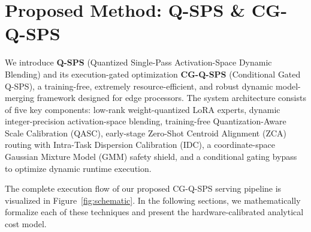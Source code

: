 \section{Proposed Method: Q-SPS \& CG-Q-SPS}
\label{sec:method}

We introduce \textbf{Q-SPS} (Quantized Single-Pass Activation-Space Dynamic Blending) and its execution-gated optimization \textbf{CG-Q-SPS} (Conditional Gated Q-SPS), a training-free, extremely resource-efficient, and robust dynamic model-merging framework designed for edge processors. The system architecture consists of five key components: low-rank weight-quantized LoRA experts, dynamic integer-precision activation-space blending, training-free Quantization-Aware Scale Calibration (QASC), early-stage Zero-Shot Centroid Alignment (ZCA) routing with Intra-Task Dispersion Calibration (IDC), a coordinate-space Gaussian Mixture Model (GMM) safety shield, and a conditional gating bypass to optimize dynamic runtime execution.

The complete execution flow of our proposed CG-Q-SPS serving pipeline is visualized in Figure~\ref{fig:schematic}. In the following sections, we mathematically formalize each of these techniques and present the hardware-calibrated analytical cost model.

